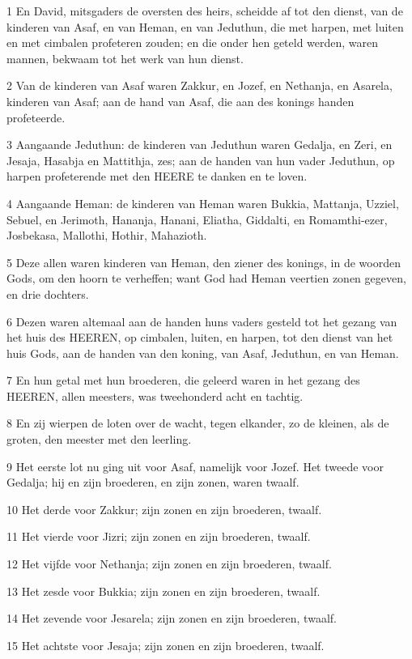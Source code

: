 \par 1 En David, mitsgaders de oversten des heirs, scheidde af tot den dienst, van de kinderen van Asaf, en van Heman, en van Jeduthun, die met harpen, met luiten en met cimbalen profeteren zouden; en die onder hen geteld werden, waren mannen, bekwaam tot het werk van hun dienst.
\par 2 Van de kinderen van Asaf waren Zakkur, en Jozef, en Nethanja, en Asarela, kinderen van Asaf; aan de hand van Asaf, die aan des konings handen profeteerde.
\par 3 Aangaande Jeduthun: de kinderen van Jeduthun waren Gedalja, en Zeri, en Jesaja, Hasabja en Mattithja, zes; aan de handen van hun vader Jeduthun, op harpen profeterende met den HEERE te danken en te loven.
\par 4 Aangaande Heman: de kinderen van Heman waren Bukkia, Mattanja, Uzziel, Sebuel, en Jerimoth, Hananja, Hanani, Eliatha, Giddalti, en Romamthi-ezer, Josbekasa, Mallothi, Hothir, Mahazioth.
\par 5 Deze allen waren kinderen van Heman, den ziener des konings, in de woorden Gods, om den hoorn te verheffen; want God had Heman veertien zonen gegeven, en drie dochters.
\par 6 Dezen waren altemaal aan de handen huns vaders gesteld tot het gezang van het huis des HEEREN, op cimbalen, luiten, en harpen, tot den dienst van het huis Gods, aan de handen van den koning, van Asaf, Jeduthun, en van Heman.
\par 7 En hun getal met hun broederen, die geleerd waren in het gezang des HEEREN, allen meesters, was tweehonderd acht en tachtig.
\par 8 En zij wierpen de loten over de wacht, tegen elkander, zo de kleinen, als de groten, den meester met den leerling.
\par 9 Het eerste lot nu ging uit voor Asaf, namelijk voor Jozef. Het tweede voor Gedalja; hij en zijn broederen, en zijn zonen, waren twaalf.
\par 10 Het derde voor Zakkur; zijn zonen en zijn broederen, twaalf.
\par 11 Het vierde voor Jizri; zijn zonen en zijn broederen, twaalf.
\par 12 Het vijfde voor Nethanja; zijn zonen en zijn broederen, twaalf.
\par 13 Het zesde voor Bukkia; zijn zonen en zijn broederen, twaalf.
\par 14 Het zevende voor Jesarela; zijn zonen en zijn broederen, twaalf.
\par 15 Het achtste voor Jesaja; zijn zonen en zijn broederen, twaalf.
